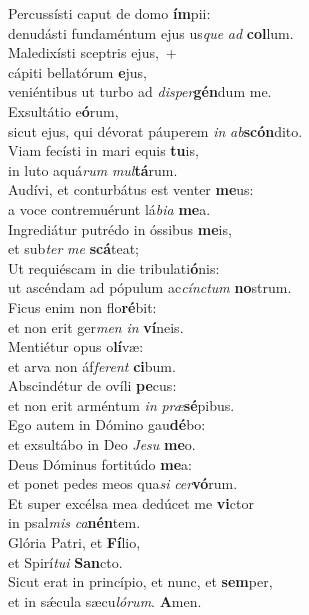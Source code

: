 \evenverse Percussísti caput de domo \textbf{ím}pii:~\*\\
\evenverse denudásti fundaméntum ejus us\textit{que} \textit{ad} \textbf{col}lum.\\
\oddverse Maledixísti sceptris ejus,~+\\
\oddverse  cápiti bellatórum \textbf{e}jus,~\*\\
\oddverse veniéntibus ut turbo ad \textit{di}\textit{sper}\textbf{gén}dum me.\\
\evenverse Exsultátio e\textbf{ó}rum,~\*\\
\evenverse sicut ejus, qui dévorat páuperem \textit{in} \textit{ab}\textbf{scón}dito.\\
\oddverse Viam fecísti in mari equis \textbf{tu}is,~\*\\
\oddverse in luto aquá\textit{rum} \textit{mul}\textbf{tá}rum.\\
\evenverse Audívi, et conturbátus est venter \textbf{me}us:~\*\\
\evenverse a voce contremuérunt lá\textit{bi}\textit{a} \textbf{me}a.\\
\oddverse Ingrediátur putrédo in óssibus \textbf{me}is,~\*\\
\oddverse et sub\textit{ter} \textit{me} \textbf{scá}teat;\\
\evenverse Ut requiéscam in die tribulati\textbf{ó}nis:~\*\\
\evenverse ut ascéndam ad pópulum ac\textit{cín}\textit{ctum} \textbf{no}strum.\\
\oddverse Ficus enim non flo\textbf{ré}bit:~\*\\
\oddverse et non erit ger\textit{men} \textit{in} \textbf{ví}neis.\\
\evenverse Mentiétur opus o\textbf{lí}væ:~\*\\
\evenverse et arva non áf\textit{fe}\textit{rent} \textbf{ci}bum.\\
\oddverse Abscindétur de ovíli \textbf{pe}cus:~\*\\
\oddverse et non erit arméntum \textit{in} \textit{præ}\textbf{sé}pibus.\\
\evenverse Ego autem in Dómino gau\textbf{dé}bo:~\*\\
\evenverse et exsultábo in Deo \textit{Je}\textit{su} \textbf{me}o.\\
\oddverse Deus Dóminus fortitúdo \textbf{me}a:~\*\\
\oddverse et ponet pedes meos qua\textit{si} \textit{cer}\textbf{vó}rum.\\
\evenverse Et super excélsa mea dedúcet me \textbf{vi}ctor~\*\\
\evenverse in psal\textit{mis} \textit{ca}\textbf{nén}tem.\\
\oddverse Glória Patri, et \textbf{Fí}lio,~\*\\
\oddverse et Spirí\textit{tu}\textit{i} \textbf{San}cto.\\
\evenverse Sicut erat in princípio, et nunc, et \textbf{sem}per,~\*\\
\evenverse et in sǽcula sæcu\textit{ló}\textit{rum}. \textbf{A}men.\\
